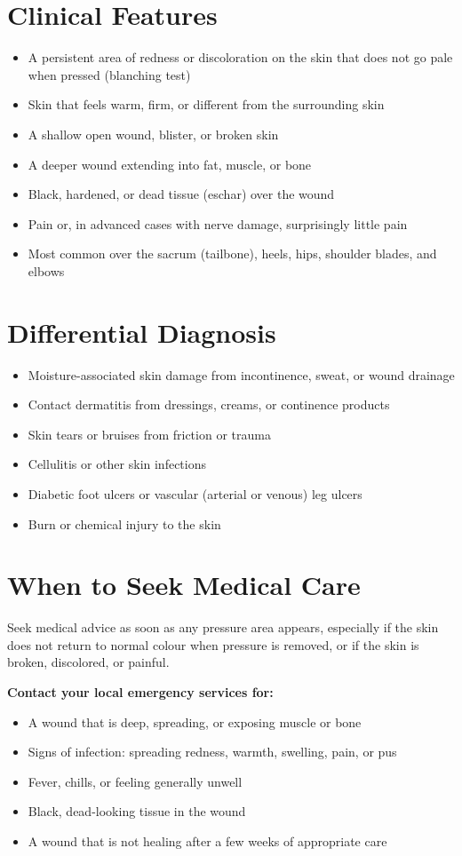 \section*{Clinical Features}
\begin{itemize}
    \item A persistent area of redness or discoloration on the skin that does not go pale when pressed (blanching test)
    \item Skin that feels warm, firm, or different from the surrounding skin
    \item A shallow open wound, blister, or broken skin
    \item A deeper wound extending into fat, muscle, or bone
    \item Black, hardened, or dead tissue (eschar) over the wound
    \item Pain or, in advanced cases with nerve damage, surprisingly little pain
    \item Most common over the sacrum (tailbone), heels, hips, shoulder blades, and elbows
\end{itemize}

\section*{Differential Diagnosis}
\begin{itemize}
    \item Moisture-associated skin damage from incontinence, sweat, or wound drainage
    \item Contact dermatitis from dressings, creams, or continence products
    \item Skin tears or bruises from friction or trauma
    \item Cellulitis or other skin infections
    \item Diabetic foot ulcers or vascular (arterial or venous) leg ulcers
    \item Burn or chemical injury to the skin
\end{itemize}

\section*{When to Seek Medical Care}
Seek medical advice as soon as any pressure area appears, especially if the skin does not return to normal colour when pressure is removed, or if the skin is broken, discolored, or painful.

\textbf{Contact your local emergency services for:}
\begin{itemize}
    \item A wound that is deep, spreading, or exposing muscle or bone
    \item Signs of infection: spreading redness, warmth, swelling, pain, or pus
    \item Fever, chills, or feeling generally unwell
    \item Black, dead-looking tissue in the wound
    \item A wound that is not healing after a few weeks of appropriate care
\end{itemize}

